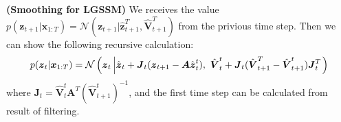 \begin{proposition}{\textbf{(Smoothing for LGSSM)}}
    We receives the value $p(\boldsymbol z_{t+1} | \boldsymbol x_{1:T}) = \mathcal{N}(\boldsymbol z_{t+1} | \hat{\boldsymbol z}^T_{t+1}, \hat{\boldsymbol V}^T_{t+1})$ from the privious time step. Then we can show the following recursive calculation:
    \begin{equation*}
        p(\boldsymbol z_t | \boldsymbol x_{1:T}) = \mathcal{N}\left( \boldsymbol z_t \left| \hat{\boldsymbol z}_t +  \boldsymbol J_t(\boldsymbol z_{t+1} - \boldsymbol A\hat{\boldsymbol z}^t_{t}), \ \hat{\boldsymbol V}^t_t + \boldsymbol J_t(\hat{\boldsymbol V}^T_{t+1}-\hat{\boldsymbol V}^t_{t+1}) \boldsymbol J_t^T\right. \right) 
    \end{equation*}
    where $\boldsymbol J_t = \hat{\boldsymbol V}^t_t \boldsymbol A^T(\hat{\boldsymbol V}^t_{t+1})^{-1}$, and the first time step can be calculated from result of filtering.
\end{proposition}
